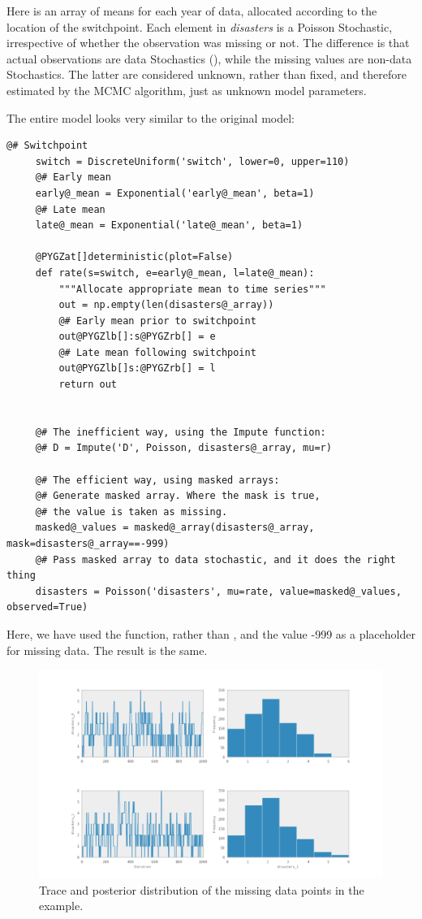 \documentclass[letterpaper,10pt,english]{sphinxmanual}
\begin{document}
Here  is an array of means for each year of data, allocated according to the location of the switchpoint. Each element in \emph{disasters} is a Poisson Stochastic, irrespective of whether the observation was missing or not. The difference is that actual observations are data Stochastics (), while the missing values are non-data Stochastics. The latter are considered unknown, rather than fixed, and therefore estimated by the MCMC algorithm, just as unknown model parameters.

The entire model looks very similar to the original model:

\begin{Verbatim}[commandchars=@\[\]]
@# Switchpoint
     switch = DiscreteUniform('switch', lower=0, upper=110)
     @# Early mean
     early@_mean = Exponential('early@_mean', beta=1)
     @# Late mean
     late@_mean = Exponential('late@_mean', beta=1)

     @PYGZat[]deterministic(plot=False)
     def rate(s=switch, e=early@_mean, l=late@_mean):
         """Allocate appropriate mean to time series"""
         out = np.empty(len(disasters@_array))
         @# Early mean prior to switchpoint
         out@PYGZlb[]:s@PYGZrb[] = e
         @# Late mean following switchpoint
         out@PYGZlb[]s:@PYGZrb[] = l
         return out


     @# The inefficient way, using the Impute function:
     @# D = Impute('D', Poisson, disasters@_array, mu=r)

     @# The efficient way, using masked arrays:
     @# Generate masked array. Where the mask is true,
     @# the value is taken as missing.
     masked@_values = masked@_array(disasters@_array, mask=disasters@_array==-999)
     @# Pass masked array to data stochastic, and it does the right thing
     disasters = Poisson('disasters', mu=rate, value=masked@_values, observed=True)
\end{Verbatim}

Here, we have used the  function, rather than , and the value -999 as a placeholder for missing data. The result is the same.
\begin{figure}[htbp]
\centering
\capstart

\includegraphics{missing.pdf}
\caption{Trace and posterior distribution of the missing data points in the example.}\end{figure}
\end{document}

